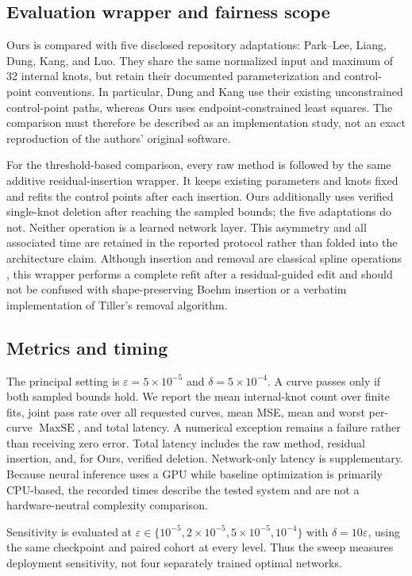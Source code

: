 \documentclass[preprint,12pt]{elsarticle}
\newcommand{\Peak}{\operatorname{MaxSE}}
\begin{document}
\subsection{Evaluation wrapper and fairness scope}
\label{sec:evaluation-wrapper}
Ours is compared with five disclosed repository adaptations: Park--Lee,
Liang, Dung, Kang, and Luo. They share the same normalized input and maximum
of 32 internal knots, but retain their documented parameterization and
control-point conventions. In particular, Dung and Kang use their existing
unconstrained control-point paths, whereas Ours uses endpoint-constrained
least squares. The comparison must therefore be described as an implementation
study, not an exact reproduction of the authors' original software.

For the threshold-based comparison, every raw method is followed by the same
additive residual-insertion wrapper. It keeps existing parameters and knots
fixed and refits the control points after each insertion. Ours additionally
uses verified single-knot deletion after reaching the sampled bounds; the five
adaptations do not. Neither operation is a learned network layer. This
asymmetry and all associated time are retained in the reported protocol rather
than folded into the architecture claim. Although insertion and removal are
classical spline operations \cite{boehm1980,tiller1992}, this wrapper performs
a complete refit after a residual-guided edit and should not be confused with
shape-preserving Boehm insertion or a verbatim implementation of Tiller's
removal algorithm.

\subsection{Metrics and timing}
The principal setting is $\varepsilon=5\times10^{-5}$ and
$\delta=5\times10^{-4}$. A curve passes only if both sampled bounds hold.
We report the mean internal-knot count over finite fits, joint pass rate over
all requested curves, mean MSE, mean and worst per-curve $\Peak$, and total
latency. A numerical exception remains a failure rather than receiving zero
error. Total latency includes the raw method, residual insertion, and, for
Ours, verified deletion. Network-only latency is supplementary. Because neural
inference uses a GPU while baseline optimization is primarily CPU-based, the
recorded times describe the tested system and are not a hardware-neutral
complexity comparison.

Sensitivity is evaluated at
$\varepsilon\in\{10^{-5},2\times10^{-5},5\times10^{-5},10^{-4}\}$ with
$\delta=10\varepsilon$, using the same checkpoint and paired cohort at every
level. Thus the sweep measures deployment sensitivity, not four separately
trained optimal networks.
\end{document}
